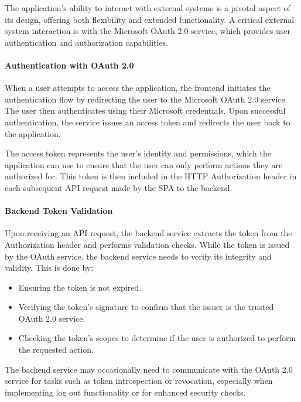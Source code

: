 The application's ability to interact with external systems is a pivotal aspect of its design, offering both flexibility and extended functionality. A critical external system interaction is with the Microsoft OAuth 2.0 service, which provides user authentication and authorization capabilities.

\paragraph{Authentication with OAuth 2.0}
When a user attempts to access the application, the frontend initiates the authentication flow by redirecting the user to the Microsoft OAuth 2.0 service. The user then authenticates using their Microsoft credentials. Upon successful authentication, the service issues an access token and redirects the user back to the application.

The access token represents the user's identity and permissions, which the application can use to ensure that the user can only perform actions they are authorized for. This token is then included in the HTTP Authorization header in each subsequent API request made by the SPA to the backend.

\paragraph{Backend Token Validation}
Upon receiving an API request, the backend service extracts the token from the Authorization header and performs validation checks. While the token is issued by the OAuth service, the backend service needs to verify its integrity and validity. This is done by:

\begin{itemize}
    \item Ensuring the token is not expired.
    \item Verifying the token's signature to confirm that the issuer is the trusted OAuth 2.0 service.
    \item Checking the token's scopes to determine if the user is authorized to perform the requested action.
\end{itemize}

The backend service may occasionally need to communicate with the OAuth 2.0 service for tasks such as token introspection or revocation, especially when implementing log out functionality or for enhanced security checks.

